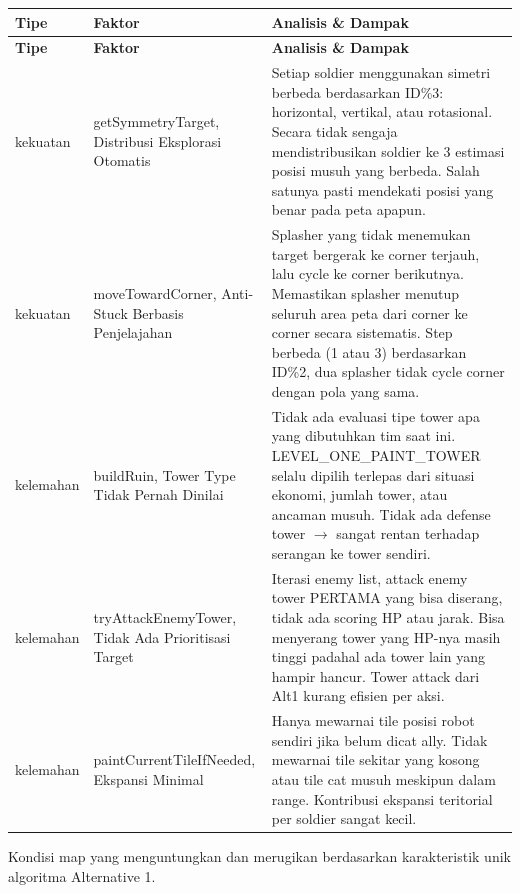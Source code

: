 \documentclass{article}
\begin{document}
\begin{enumerate}[label=\alph*.]
\begin{longtable}{|p{2cm}|p{3.5cm}|p{8.5cm}|}
\hline
\textbf{Tipe} & \textbf{Faktor} & \textbf{Analisis \& Dampak} \\
\hline
\endfirsthead
\hline
\textbf{Tipe} & \textbf{Faktor} & \textbf{Analisis \& Dampak} \\
\hline
\endhead
\hline
\endfoot
kekuatan
& getSymmetryTarget, Distribusi Eksplorasi Otomatis
& Setiap soldier menggunakan simetri berbeda berdasarkan ID\%3: horizontal, vertikal, atau rotasional.
Secara tidak sengaja mendistribusikan soldier ke 3 estimasi posisi musuh yang berbeda.
Salah satunya pasti mendekati posisi yang benar pada peta apapun. \\
\hline
kekuatan
& moveTowardCorner, Anti-Stuck Berbasis Penjelajahan
& Splasher yang tidak menemukan target bergerak ke corner terjauh, lalu cycle ke corner berikutnya.
Memastikan splasher menutup seluruh area peta dari corner ke corner secara sistematis.
Step berbeda (1 atau 3) berdasarkan ID\%2, dua splasher tidak cycle corner dengan pola yang sama. \\
\hline
kelemahan
& buildRuin, Tower Type Tidak Pernah Dinilai
& Tidak ada evaluasi tipe tower apa yang dibutuhkan tim saat ini.
LEVEL\_ONE\_PAINT\_TOWER selalu dipilih terlepas dari situasi ekonomi, jumlah tower, atau ancaman musuh.
Tidak ada defense tower $\rightarrow$ sangat rentan terhadap serangan ke tower sendiri. \\
\hline
kelemahan
& tryAttackEnemyTower, Tidak Ada Prioritisasi Target
& Iterasi enemy list, attack enemy tower PERTAMA yang bisa diserang, tidak ada scoring HP atau jarak.
Bisa menyerang tower yang HP-nya masih tinggi padahal ada tower lain yang hampir hancur.
Tower attack dari Alt1 kurang efisien per aksi. \\
\hline
kelemahan
& paintCurrentTileIfNeeded, Ekspansi Minimal
& Hanya mewarnai tile posisi robot sendiri jika belum dicat ally.
Tidak mewarnai tile sekitar yang kosong atau tile cat musuh meskipun dalam range.
Kontribusi ekspansi teritorial per soldier sangat kecil. \\
\hline
\end{longtable}


Kondisi map yang menguntungkan dan merugikan berdasarkan karakteristik unik algoritma Alternative 1.


\end{enumerate}
\end{document}
